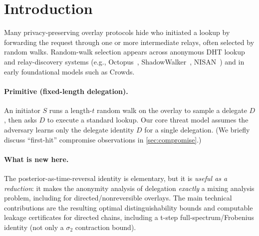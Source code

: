 \documentclass[11pt]{article}
\begin{document}
\section{Introduction}\label{sec:intro}
Many privacy-preserving overlay protocols hide who initiated a lookup by
forwarding the request through one or more intermediate relays, often selected
by random walks. Random-walk selection appears across anonymous DHT lookup and
relay-discovery systems (e.g., Octopus~\cite{octopus}, ShadowWalker~\cite{shadowwalker}, NISAN~\cite{nisan}) and in early
foundational models such as Crowds.

\paragraph{Primitive (fixed-length delegation).}
An initiator $S$ runs a length-$t$ random walk on the overlay to sample a
delegate $D$, then asks $D$ to execute a standard lookup. Our core threat model
assumes the adversary learns only the delegate identity $D$ for a single
delegation. (We briefly discuss ``first-hit'' compromise observations in
\cref{sec:compromise}.)

\paragraph{What is new here.}
The posterior-as-time-reversal identity is elementary, but it is \emph{useful as
a reduction}: it makes the anonymity analysis of delegation \emph{exactly} a
mixing analysis problem, including for directed/nonreversible overlays. The
main technical contributions are the resulting optimal distinguishability bounds
and computable leakage certificates for directed chains, including a
t-step full-spectrum/Frobenius identity (not only a $\sigma_2$ contraction bound).
\end{document}
